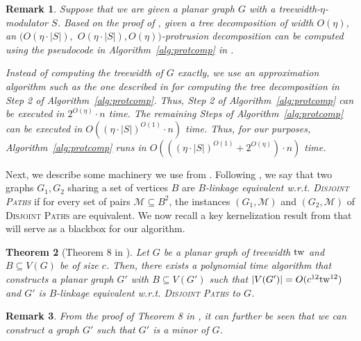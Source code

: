 \documentclass{article}
\newcommand{\tw}{{\rm tw}}
\newtheorem{theorem}{Theorem}
\newtheorem{remark}[theorem]{Remark}
\numberwithin{claimcounter}{lemma}
\newcommand{\dispaths}{\textsc{Disjoint Paths}\xspace}
\begin{document}
\begin{remark} \label{rem:prottime}
    Suppose that we are given a planar graph $G$ with a treewidth-$\eta$-modulator $S$. Based on the proof of \cite[Lemmas 15.13 and 15.14]{kernelbook}, given a tree decomposition of width $O(\eta)$, an $(O(\eta \cdot |S|),$ $ O(\eta \cdot |S|), O(\eta))$-protrusion decomposition can be computed using the pseudocode in Algorithm~\ref{alg:protcomp} in .
    
    Instead of computing the treewidth of $G$ exactly, we use an approximation algorithm such as the one described in \cite{treewidthSingle} for computing the tree decomposition in Step 2 of Algorithm~\ref{alg:protcomp}. Thus, Step 2 of  Algorithm~\ref{alg:protcomp} can be executed in $2^{O(\eta)}\cdot n$ time. The remaining Steps of Algorithm~\ref{alg:protcomp}  can be executed in $O({(\eta \cdot |S|)}^{O(1)}\cdot n)$ time.
    Thus, for our purposes, Algorithm~\ref{alg:protcomp} runs in $O(({(\eta \cdot |S|)}^{O(1)}+ 2^{O(\eta)})\cdot n)$ time.
    \end{remark}



Next, we describe some machinery we use from \cite{DBLP:conf/focs/0001Z23}. Following \cite{DBLP:conf/focs/0001Z23}, we say that two graphs $G_1, G_2$ sharing a set of vertices $B$ are {\em $B$-linkage equivalent w.r.t. \dispaths} if for every set of pairs $\mathcal{M} \subseteq B^2$, the instances $(G_1,\mathcal{M})$ and $(G_2,\mathcal{M})$ of \dispaths are equivalent. We now recall a key kernelization result from \cite{DBLP:conf/focs/0001Z23} that will serve as a blackbox for our algorithm.



\begin{theorem}[Theorem 8 in \cite{DBLP:conf/focs/0001Z23}]
\label{thm:outline:polyKer}
Let $G$ be a planar graph of treewidth $\tw$ and $B \subseteq V(G)$ be of size $c$. 
Then, there exists a polynomial time algorithm that constructs a planar graph $G'$ with $B \subseteq V(G')$ such that $|V(G')| = O(c^{12}\tw^{12})$ and $G'$ is $B$-linkage equivalent w.r.t. \dispaths to $G$.
\end{theorem}

\begin{remark}
    From the proof of Theorem 8 in \cite{DBLP:conf/focs/0001Z23}, it can further be seen that we can construct a graph $G'$ such that $G'$ is a minor of $G$.
\end{remark}
\end{document}
